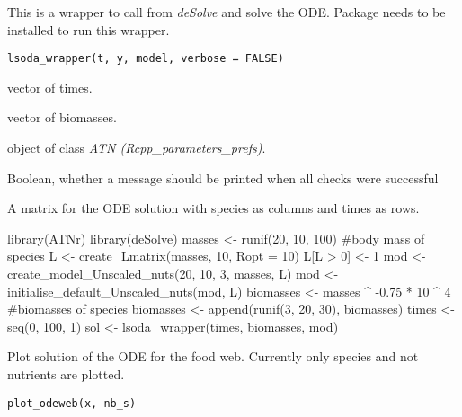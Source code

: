 \documentclass[letterpaper]{book}
\begin{document}
%
\begin{Description}\relax
This is a wrapper to call  from
\emph{deSolve} and solve the ODE.
Package  needs to be installed to run
this wrapper.
\end{Description}
%
\begin{Usage}
\begin{verbatim}
lsoda_wrapper(t, y, model, verbose = FALSE)
\end{verbatim}
\end{Usage}
%
\begin{Arguments}
\begin{ldescription}
\item[\code{t}] vector of times.

\item[\code{y}] vector of biomasses.

\item[\code{model}] object of class \emph{ATN (Rcpp\_parameters\_prefs)}.

\item[\code{verbose}] Boolean, whether a message should be printed when all checks were successful
\end{ldescription}
\end{Arguments}
%
\begin{Value}
A matrix for the ODE solution with species as columns and
times as rows.
\end{Value}
%
\begin{Examples}
\begin{ExampleCode}
library(ATNr)
library(deSolve)
masses <- runif(20, 10, 100) #body mass of species
L <- create_Lmatrix(masses, 10, Ropt = 10)
L[L > 0] <- 1
mod <- create_model_Unscaled_nuts(20, 10, 3, masses, L)
mod <- initialise_default_Unscaled_nuts(mod, L)
biomasses <- masses ^ -0.75 * 10 ^ 4 #biomasses of species
biomasses <- append(runif(3, 20, 30), biomasses)
times <- seq(0, 100, 1)
sol <- lsoda_wrapper(times, biomasses, mod)
\end{ExampleCode}
\end{Examples}
%
\begin{Description}\relax
Plot solution of the ODE for the food web. Currently only
species and not nutrients are plotted.
\end{Description}
%
\begin{Usage}
\begin{verbatim}
plot_odeweb(x, nb_s)
\end{verbatim}
\end{Usage}
\end{document}
